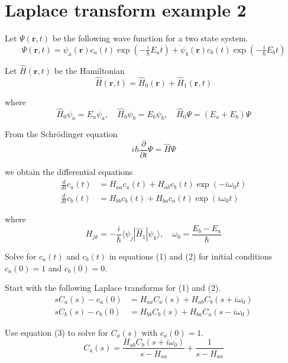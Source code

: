 

\section*{Laplace transform example 2}

Let $\Psi(\mathbf r,t)$ be the following wave function for a two state system.
\begin{equation*}
\Psi(\mathbf r,t)=\psi_a(\mathbf r)c_a(t)\exp(-\tfrac{i}{\hbar}E_at)+
\psi_b(\mathbf r)c_b(t)\exp(-\tfrac{i}{\hbar}E_bt)
\end{equation*}

Let $\hat H(\mathbf r,t)$ be the Hamiltonian
\begin{equation*}
\hat H(\mathbf r,t)=\hat H_0(\mathbf r)+\hat H_1(\mathbf r,t)
\end{equation*}

where
\begin{equation*}
\hat H_0\psi_a=E_a\psi_a,\quad\hat H_0\psi_b=E_b\psi_b,\quad
\hat H_0\Psi=(E_a+E_b)\Psi
\end{equation*}

From the Schr\"odinger equation
\begin{equation*}
i\hbar\frac{\partial}{\partial t}\Psi=\hat H\Psi
\end{equation*}

we obtain the differential equations
\begin{align*}
\frac{d}{dt}c_a(t)&=H_{aa}c_a(t)+H_{ab}c_b(t)\exp(-i\omega_0t)
\tag{1}
\\[1ex]
\frac{d}{dt}c_b(t)&=H_{bb}c_b(t)+H_{ba}c_a(t)\exp(i\omega_0t)
\tag{2}
\end{align*}

where
\begin{equation*}
H_{jk}=-\frac{i}{\hbar}\langle\psi_j|\hat H_1|\psi_k\rangle,\quad
\omega_0=\frac{E_b-E_a}{\hbar}
\end{equation*}

Solve for $c_a(t)$ and $c_b(t)$ in equations (1) and (2) for
initial conditions $c_a(0)=1$ and $c_b(0)=0$.

\bigskip
Start with the following Laplace transforms for (1) and (2).
\begin{align*}
sC_a(s)-c_a(0)&=H_{aa}C_a(s)+H_{ab}C_b(s+i\omega_0)
\tag{3}
\\[1ex]
sC_b(s)-c_b(0)&=H_{bb}C_b(s)+H_{ba}C_a(s-i\omega_0)
\tag{4}
\end{align*}

Use equation (3) to solve for $C_a(s)$ with $c_a(0)=1$.
\begin{equation*}
C_a(s)=\frac{H_{ab}C_b(s+i\omega_0)}{s-H_{aa}}+\frac{1}{s-H_{aa}}
\end{equation*}

